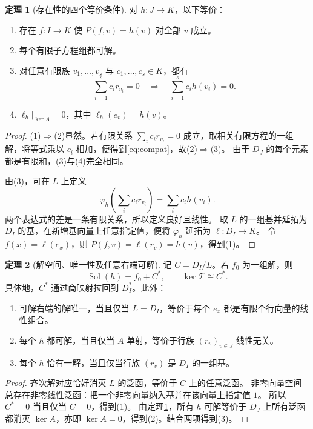 \documentclass[UTF8,11pt,a4paper]{ctexart}
\theoremstyle{definition}
\newtheorem{theorem}{定理}[section]
\newcommand{\T}{\mathcal T}
\newcommand{\Sol}{\operatorname{Sol}}
\numberwithin{equation}{section}
\begin{document}
\begin{theorem}[存在性的四个等价条件]\label{thm:scalar}
对 $h:J\to K$，以下等价：
\begin{enumerate}
\item 存在 $f:I\to K$ 使 $P(f,v)=h(v)$ 对全部 $v$ 成立。
\item 每个有限子方程组都可解。
\item 对任意有限族 $v_1,\ldots,v_s$ 与 $c_1,\ldots,c_s\in K$，都有
\begin{equation}\label{eq:compat}
 \sum_{i=1}^s c_ir_{v_i}=0
 \quad\Longrightarrow\quad
 \sum_{i=1}^s c_ih(v_i)=0.
\end{equation}
\item $\ell_h|_{\ker A}=0$，其中 $\ell_h(e_v)=h(v)$。
\end{enumerate}
\end{theorem}
\begin{proof}
(1)$\Rightarrow$(2)显然。若有限关系 $\sum_i c_ir_{v_i}=0$ 成立，取相关有限方程的一组解，将等式乘以 $c_i$ 相加，便得到\eqref{eq:compat}，故(2)$\Rightarrow$(3)。
由于 $D_J$ 的每个元素都是有限和，(3)与(4)完全相同。

由(3)，可在 $L$ 上定义
\[
 \varphi_h\!\left(\sum_i c_ir_{v_i}\right)=\sum_i c_ih(v_i).
\]
两个表达式的差是一条有限关系，所以定义良好且线性。
取 $L$ 的一组基并延拓为 $D_I$ 的基，在新增基向量上任意指定值，便将 $\varphi_h$ 延拓为 $\ell:D_I\to K$。
令 $f(x)=\ell(e_x)$，则 $P(f,v)=\ell(r_v)=h(v)$，得到(1)。
\end{proof}

\begin{theorem}[解空间、唯一性及任意右端可解]\label{thm:scalarstructure}
记 $C=D_I/L$。若 $f_0$ 为一组解，则
\begin{equation}\label{eq:scalarstructure}
 \Sol(h)=f_0+C^*,\qquad \ker\T\cong C^*.
\end{equation}
具体地，$C^*$ 通过商映射拉回到 $D_I^*$。此外：
\begin{enumerate}
\item 可解右端的解唯一，当且仅当 $L=D_I$，等价于每个 $e_x$ 都是有限个行向量的线性组合。
\item 每个 $h$ 都可解，当且仅当 $A$ 单射，等价于行族 $(r_v)_{v\in J}$ 线性无关。
\item 每个 $h$ 恰有一解，当且仅当行族 $(r_v)$ 是 $D_I$ 的一组基。
\end{enumerate}
\end{theorem}
\begin{proof}
齐次解对应恰好消灭 $L$ 的泛函，等价于 $C$ 上的任意泛函。
非零向量空间总存在非零线性泛函：把一个非零向量纳入基并在该向量上指定值 $1$。
所以 $C^*=0$ 当且仅当 $C=0$，得到(1)。
由定理\ref{thm:scalar}，所有 $h$ 可解等价于 $D_J$ 上所有泛函都消灭 $\ker A$，亦即 $\ker A=0$，得到(2)。结合两项得到(3)。
\end{proof}
\end{document}
